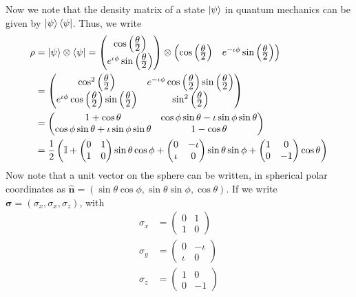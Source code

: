 Now we note that the density matrix of a state $\left\vert \psi\right\rangle$ in quantum mechanics can be given by $\left\vert \psi\right\rangle\left\langle \psi\right\vert$. Thus, we write
\begin{equation}
\label{eq:Ab.1}
\begin{split}
\rho&=\left\vert \psi\right\rangle\otimes\left\langle \psi\right\vert=\begin{pmatrix}
\cos\left(\frac{\displaystyle \theta}{\displaystyle 2}\right)\\
e^{\iota\phi}\sin\left(\frac{\displaystyle \theta}{\displaystyle 2}\right)
\end{pmatrix}\otimes
\begin{pmatrix}
\cos\left(\frac{\displaystyle \theta}{\displaystyle 2}\right)&e^{-\iota\phi}\sin\left(\frac{\displaystyle \theta}{\displaystyle 2}\right)
\end{pmatrix}\\
&=
\begin{pmatrix}
\cos^2\left(\frac{\displaystyle \theta}{\displaystyle 2}\right)&e^{-\iota\phi}\cos\left(\frac{\displaystyle \theta}{\displaystyle 2}\right)\sin\left(\frac{\displaystyle \theta}{\displaystyle 2}\right)\\
e^{\iota\phi}\cos\left(\frac{\displaystyle \theta}{\displaystyle 2}\right)\sin\left(\frac{\displaystyle \theta}{\displaystyle 2}\right)&\sin^2\left(\frac{\displaystyle \theta}{\displaystyle 2}\right)
\end{pmatrix}\\
&=
\begin{pmatrix}
1+\cos\theta&\cos\phi\sin\theta-\iota\sin\phi\sin\theta\\
\cos\phi\sin\theta+\iota\sin\phi\sin\theta&1-\cos\theta
\end{pmatrix}\\
&=
\frac{\displaystyle 1}{\displaystyle 2}\left(
\mathbb{I}+
\begin{pmatrix}
0&1\\
1&0
\end{pmatrix}
\sin\theta\cos\phi+
\begin{pmatrix}
0&-\iota\\
\iota&0
\end{pmatrix}
\sin\theta\sin\phi+
\begin{pmatrix}
1&0\\
0&-1
\end{pmatrix}
\cos\theta
\right)
\end{split}
\end{equation}
Now note that a unit vector on the sphere can be written, in spherical polar coordinates as $\hat{\mathbf{n}}=(\sin\theta\cos\phi,\sin\theta\sin\phi,\cos\theta)$. If we write $\mathbf{\sigma}=(\sigma_x, \sigma_x, \sigma_z)$, with
\begin{equation}
\label{eq:Ab.2}
\begin{split}
\sigma_x&=\begin{pmatrix}
0&1\\
1&0
\end{pmatrix}\\
\sigma_y&=\begin{pmatrix}
0&-\iota\\
\iota&0
\end{pmatrix}\\
\sigma_z&=\begin{pmatrix}
1&0\\
0&-1
\end{pmatrix}
\end{split}
\end{equation}
